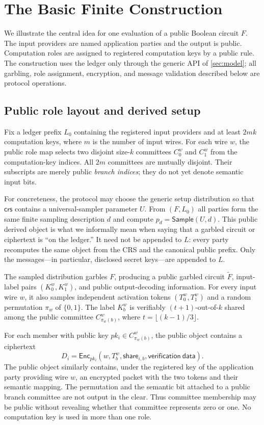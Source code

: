 \section{The Basic Finite Construction}
\label{sec:basic-construction}

We illustrate the central idea for one evaluation of a public Boolean circuit
$F$. The input providers are named application parties and the output is
public. Computation roles are assigned to registered computation keys by a
public rule. The construction uses the ledger only through the generic API of
\cref{sec:model}; all garbling, role assignment, encryption, and message
validation described below are protocol operations.

\subsection{Public role layout and derived setup}

Fix a ledger prefix $L_0$ containing the registered input providers and at
least $2mk$ computation keys, where $m$ is the number of input wires. For
each wire $w$, the public role map selects two disjoint size-$k$ committees
$C^w_0$ and $C^w_1$ from the computation-key indices. All $2m$ committees
are mutually disjoint. Their subscripts are merely public \emph{branch
indices}; they do not yet denote semantic input bits.

For concreteness, the protocol may choose the generic setup distribution so
that $\mathsf{crs}$ contains a universal-sampler parameter $U$. From
$(F,L_0)$ all parties form the same finite sampling description $d$ and
compute $p_d=\mathsf{Sample}(U,d)$. This public derived object is what we
informally mean when saying that a garbled circuit or ciphertext is ``on the
ledger.'' It need not be appended to $L$: every party recomputes the same
object from the CRS and the canonical public prefix. Only the messages---in
particular, disclosed secret keys---are appended to $L$.

The sampled distribution garbles $F$, producing a public garbled circuit
$\widetilde F$, input-label pairs $(K^w_0,K^w_1)$, and public output-decoding
information. For every input wire $w$, it also samples independent activation
tokens $(T^w_0,T^w_1)$ and a random permutation $\pi_w$ of $\{0,1\}$. The
label $K^w_b$ is verifiably $(t+1)$-out-of-$k$ shared among the public
committee $C^w_{\pi_w(b)}$, where $t=\lfloor(k-1)/3\rfloor$.

For each member with public key $pk_i\in C^w_{\pi_w(b)}$, the public object
contains a ciphertext
\[
  D_i=\mathsf{Enc}_{pk_i}
      (w,T^w_b,\mathsf{share}_{i,b},\mathsf{verification\ data}).
\]
The public object similarly contains, under the registered key of the
application party providing wire $w$, an encrypted packet with the two tokens
and their semantic mapping. The permutation and the semantic bit attached to
a public branch committee are not output in the clear. Thus committee
membership may be public without revealing whether that committee represents
zero or one.
No computation key is used in more than one role.

